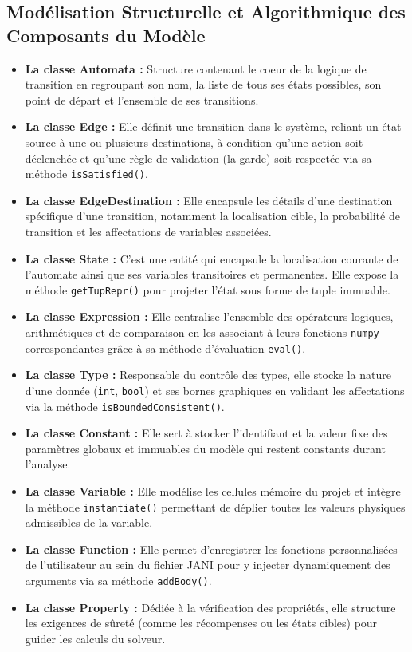 \documentclass[14pt, a4paper]{extarticle}
\begin{document}
\subsection{Modélisation Structurelle et Algorithmique des Composants du Modèle}

\begin{itemize}
   \item\textbf{La classe Automata :} Structure contenant le coeur de la logique de transition en regroupant son nom, la liste de tous ses états possibles, son point de départ et l'ensemble de ses transitions.
   \item\textbf{La classe Edge :} Elle définit une transition dans le système, reliant un état source à une ou plusieurs destinations, à condition qu'une action soit déclenchée et qu'une règle de validation (la garde) soit respectée via sa méthode \texttt{isSatisfied()}.
   \item\textbf{La classe EdgeDestination :} Elle encapsule les détails d'une destination spécifique d'une transition, notamment la localisation cible, la probabilité de transition et les affectations de variables associées.
   \item\textbf{La classe State :} C'est une entité qui encapsule la localisation courante de l'automate ainsi que ses variables transitoires et permanentes. Elle expose la méthode \texttt{getTupRepr()} pour projeter l'état sous forme de tuple immuable.
   \item\textbf{La classe Expression :} Elle centralise l'ensemble des opérateurs logiques, arithmétiques et de comparaison en les associant à leurs fonctions \texttt{numpy} correspondantes grâce à sa méthode d'évaluation \texttt{eval()}.
   \item\textbf{La classe Type :} Responsable du contrôle des types, elle stocke la nature d'une donnée (\texttt{int}, \texttt{bool}) et ses bornes graphiques en validant les affectations via la méthode \texttt{isBoundedConsistent()}.
   \item\textbf{La classe Constant :} Elle sert à stocker l'identifiant et la valeur fixe des paramètres globaux et immuables du modèle qui restent constants durant l'analyse.
   \item\textbf{La classe Variable :} Elle modélise les cellules mémoire du projet et intègre la méthode \texttt{instantiate()} permettant de déplier toutes les valeurs physiques admissibles de la variable.
   \item\textbf{La classe Function :} Elle permet d'enregistrer les fonctions personnalisées de l'utilisateur au sein du fichier JANI pour y injecter dynamiquement des arguments via sa méthode \texttt{addBody()}.
   \item\textbf{La classe Property :} Dédiée à la vérification des propriétés, elle structure les exigences de sûreté (comme les récompenses ou les états cibles) pour guider les calculs du solveur.
\end{itemize}
\end{document}

